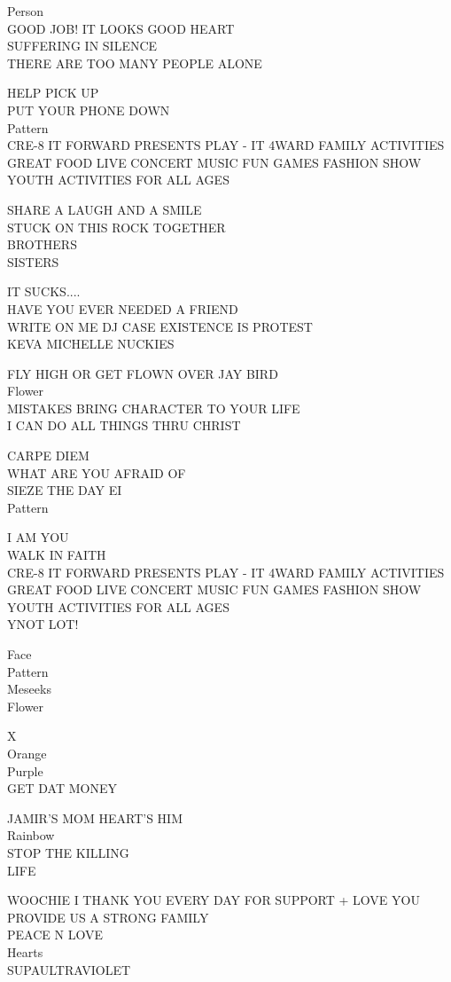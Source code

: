 \documentclass[10pt,letterpaper]{article}
\begin{document}
Person\\
GOOD JOB!  IT LOOKS GOOD HEART\\
SUFFERING IN SILENCE\\
THERE ARE TOO MANY PEOPLE ALONE

HELP PICK UP\\
PUT YOUR PHONE DOWN\\
Pattern\\
CRE{-}8 IT FORWARD PRESENTS PLAY {-} IT 4WARD FAMILY ACTIVITIES GREAT FOOD LIVE CONCERT MUSIC FUN GAMES FASHION SHOW YOUTH ACTIVITIES FOR ALL AGES

SHARE A LAUGH AND A SMILE\\
STUCK ON THIS ROCK TOGETHER\\
BROTHERS\\
SISTERS

IT SUCKS....\\
HAVE YOU EVER NEEDED A FRIEND\\
WRITE ON ME DJ CASE EXISTENCE IS PROTEST\\
KEVA MICHELLE NUCKIES

FLY HIGH OR GET FLOWN OVER JAY BIRD\\
Flower\\
MISTAKES BRING CHARACTER TO YOUR LIFE\\
I CAN DO ALL THINGS THRU CHRIST

CARPE DIEM\\
WHAT ARE YOU AFRAID OF\\
SIEZE THE DAY EI\\
Pattern

I AM YOU\\
WALK IN FAITH\\
CRE{-}8 IT FORWARD PRESENTS PLAY {-} IT 4WARD FAMILY ACTIVITIES GREAT FOOD LIVE CONCERT MUSIC FUN GAMES FASHION SHOW YOUTH ACTIVITIES FOR ALL AGES\\
YNOT LOT!

Face\\
Pattern\\
Meseeks\\
Flower

X\\
Orange\\
Purple\\
GET DAT MONEY

JAMIR'S MOM HEART'S HIM\\
Rainbow\\
STOP THE KILLING\\
LIFE

WOOCHIE I THANK YOU EVERY DAY FOR SUPPORT + LOVE YOU PROVIDE US A STRONG FAMILY\\
PEACE N LOVE\\
Hearts\\
SUPAULTRAVIOLET
\end{document}
